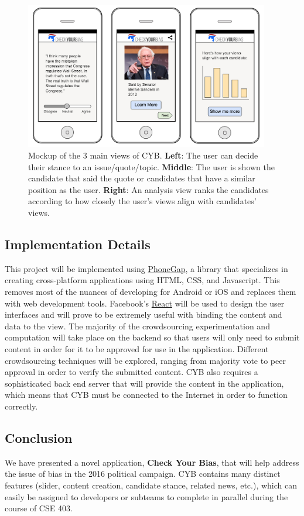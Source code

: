 \documentclass{article}
\begin{document}
\begin{figure}[t]
\begin{center}
\includegraphics[width=0.95\textwidth]{mock.png}
\vspace*{-0.05in}
\caption{Mockup of the 3 main views of CYB. \textbf{Left}: The user can decide their stance to an issue/quote/topic. \textbf{Middle}: The user is shown the candidate that said the quote or candidates that have a similar position as the user. \textbf{Right}: An analysis view ranks the candidates according to how closely the user's views align with candidates' views.}
\label{fig:mock}
\end{center}
\vspace{-0.2in}
\end{figure}

\subsection{Implementation Details}

This project will be implemented using \href{http://phonegap.com/}{PhoneGap}, a library that specializes in creating cross-platform applications using HTML, CSS, and Javascript. This removes most of the nuances of developing for Android or iOS and replaces them with web development tools. Facebook's \href{https://facebook.github.io/react/}{React} will be used to design the user interfaces and will prove to be extremely useful with binding the content and data to the view. The majority of the crowdsourcing experimentation and computation will take place on the backend so that users will only need to submit content in order for it to be approved for use in the application. Different crowdsourcing techniques will be explored, ranging from majority vote to peer approval in order to verify the submitted content. CYB also requires a sophisticated back end server that will provide the content in the application, which means that CYB must be connected to the Internet in order to function correctly.

\subsection{Conclusion}

We have presented a novel application, \textbf{Check Your Bias}, that will help address the issue of bias in the 2016 political campaign. CYB contains many distinct features (slider, content creation, candidate stance, related news, etc.), which can easily be assigned to developers or subteams to complete in parallel during the course of CSE 403. 
\end{document}
